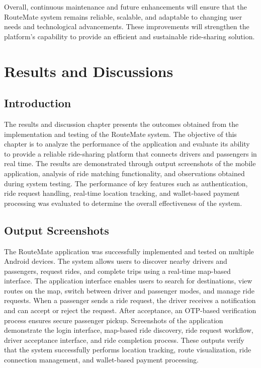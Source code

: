 \documentclass[10pt,a4paper]{report}
\begin{document}
\justify\large Overall, continuous maintenance and future enhancements will ensure that the RouteMate system remains reliable, scalable, and adaptable to changing user needs and technological advancements. These improvements will strengthen the platform’s capability to provide an efficient and sustainable ride-sharing solution.

\newpage

\chapter{Results and Discussions}

\section{Introduction}
\justify\large The results and discussion chapter presents the outcomes obtained from the implementation and testing of the RouteMate system. The objective of this chapter is to analyze the performance of the application and evaluate its ability to provide a reliable ride-sharing platform that connects drivers and passengers in real time.
\justify\large The results are demonstrated through output screenshots of the mobile application, analysis of ride matching functionality, and observations obtained during system testing. The performance of key features such as authentication, ride request handling, real-time location tracking, and wallet-based payment processing was evaluated to determine the overall effectiveness of the system.

\section{Output Screenshots}
\justify\large The RouteMate application was successfully implemented and tested on multiple Android devices. The system allows users to discover nearby drivers and passengers, request rides, and complete trips using a real-time map-based interface.
\justify\large The application interface enables users to search for destinations, view routes on the map, switch between driver and passenger modes, and manage ride requests. When a passenger sends a ride request, the driver receives a notification and can accept or reject the request. After acceptance, an OTP-based verification process ensures secure passenger pickup.
\justify\large Screenshots of the application demonstrate the login interface, map-based ride discovery, ride request workflow, driver acceptance interface, and ride completion process. These outputs verify that the system successfully performs location tracking, route visualization, ride connection management, and wallet-based payment processing.
\end{document}
